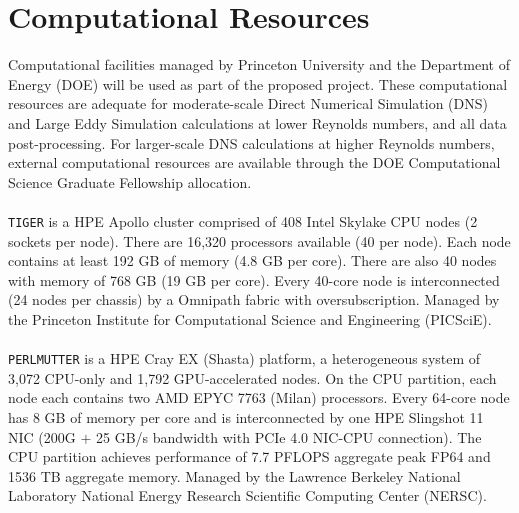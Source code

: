 \documentclass{homework}
\begin{document}
\section{\textbf{Computational Resources}}\label{appendixB}
\noindent
Computational facilities managed by Princeton University and the Department of Energy (DOE) will be used as part of the proposed project. These computational resources are adequate for moderate-scale Direct Numerical Simulation (DNS) and Large Eddy Simulation calculations at lower Reynolds numbers, and all data post-processing. For larger-scale DNS calculations at higher Reynolds numbers, external computational resources are available through the DOE Computational Science Graduate Fellowship allocation.
\\ \\
\noindent
\texttt{TIGER} \cite{TIGER} is a HPE Apollo cluster comprised of 408 Intel Skylake CPU nodes (2 sockets per node). There are 16,320 processors available (40 per node). Each node contains at least 192 GB of memory (4.8 GB per core). There are also 40 nodes with memory of 768 GB (19 GB per core). Every 40-core node is interconnected (24 nodes per chassis) by a Omnipath fabric with oversubscription. Managed by the Princeton Institute for Computational Science and Engineering (PICSciE).
\\ \\
\noindent
\texttt{PERLMUTTER} \cite{PERLMUTTER} is a HPE Cray EX (Shasta) platform, a heterogeneous system of 3,072 CPU-only and 1,792 GPU-accelerated nodes. On the CPU partition, each node each contains two AMD EPYC 7763 (Milan) processors. Every 64-core node has 8 GB of memory per core and is interconnected by one HPE Slingshot 11 NIC (200G $+$ 25 GB/s bandwidth with PCIe 4.0 NIC-CPU connection). The CPU partition achieves performance of 7.7 PFLOPS aggregate peak FP64 and 1536 TB aggregate memory. Managed by the Lawrence Berkeley National Laboratory National Energy Research Scientific Computing Center (NERSC).
\end{document}
